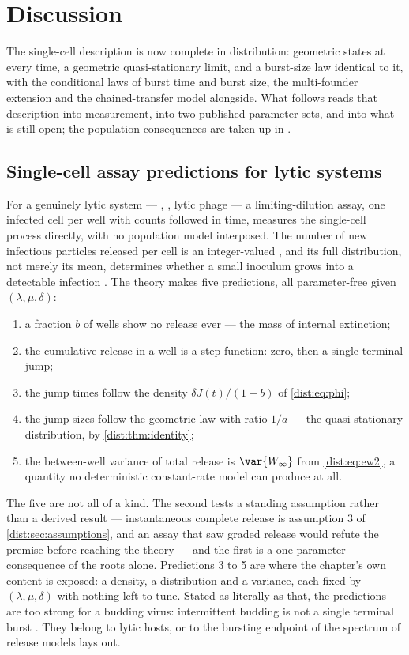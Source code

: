 \section{Discussion}
\label{dist:sec:discussion}

The single-cell description is now complete in distribution: geometric states
at every time, a geometric quasi-stationary limit, and a burst-size law
identical to it, with the conditional laws of burst time and burst size, the
multi-founder extension and the chained-transfer model alongside. What follows
reads that description into measurement, into two published parameter sets,
and into what is still open; the population consequences are taken up in
\ChPop.

\subsection{Single-cell assay predictions for lytic systems}
\label{dist:sec:discussion-assay}

For a genuinely lytic system --- \yp{}, \ft{}, lytic phage --- a
limiting-dilution assay, one infected cell per well with counts followed in
time, measures the single-cell process directly, with no population model
interposed. The number of new infectious particles released per cell is an
integer-valued \rv, and its full distribution, not merely its mean,
determines whether a small inoculum grows into a detectable infection
\cite{williams2024reproduction,pearson2011stochastic}. The theory makes five
predictions, all parameter-free given $(\lambda,\mu,\delta)$:
\begin{enumerate}[leftmargin=*,itemsep=1pt]
\item a fraction $b$ of wells show no release ever --- the mass of internal
extinction;
\item the cumulative release in a well is a step function: zero, then a
single terminal jump;
\item the jump times follow the density $\delta J(t)/(1-b)$ of
\cref{dist:eq:phi};
\item the jump sizes follow the geometric law with ratio $1/a$ --- the
quasi-stationary distribution, by \cref{dist:thm:identity};
\item the between-well variance of total release is $\var{W_\infty}$ from
\cref{dist:eq:ew2}, a quantity no deterministic constant-rate model can
produce at all.
\end{enumerate}
The five are not all of a kind. The second tests a standing assumption rather
than a derived result --- instantaneous complete release is assumption 3 of
\cref{dist:sec:assumptions}, and an assay that saw graded release would
refute the premise before reaching the theory --- and the first is a
one-parameter consequence of the roots alone. Predictions 3 to 5 are where
the chapter's own content is exposed: a density, a distribution and a
variance, each fixed by $(\lambda,\mu,\delta)$ with nothing left to tune.
Stated as literally as that, the predictions are too strong for a budding
virus: intermittent budding is not a single terminal burst
\cite{hataye2019principles}. They belong to lytic hosts, or to the bursting
endpoint of the spectrum of release models \ChPop{} lays out.

